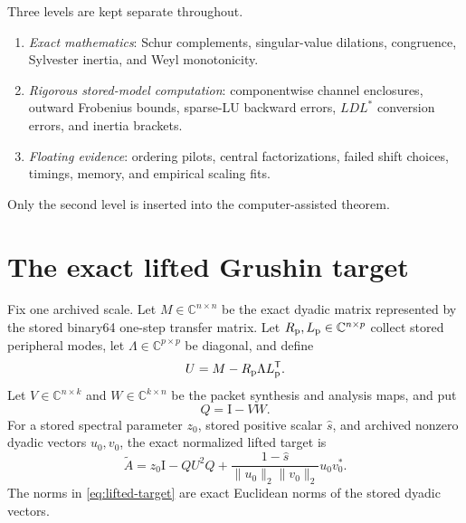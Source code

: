 \documentclass[11pt]{article}
\theoremstyle{definition}
\theoremstyle{remark}
\newcommand{\C}{\mathbb C}
\newcommand{\Id}{\mathrm I}
\newcommand{\Atilde}{\widetilde A}
\begin{document}
Three levels are kept separate throughout.
\begin{enumerate}
 \item \emph{Exact mathematics}: Schur complements, singular-value
       dilations, congruence, Sylvester inertia, and Weyl monotonicity.
 \item \emph{Rigorous stored-model computation}: componentwise channel
       enclosures, outward Frobenius bounds, sparse-LU backward errors,
       $LDL^*$ conversion errors, and inertia brackets.
 \item \emph{Floating evidence}: ordering pilots, central factorizations,
       failed shift choices, timings, memory, and empirical scaling fits.
\end{enumerate}
Only the second level is inserted into the computer-assisted theorem.


\section{The exact lifted Grushin target}
\label{sec:target}

Fix one archived scale.  Let $M\in\C^{n\times n}$ be the exact dyadic matrix
represented by the stored binary64 one-step transfer matrix.  Let
$R_{\rm p},L_{\rm p}\in\C^{n\times p}$ collect stored peripheral modes,
let $\Lambda\in\C^{p\times p}$ be diagonal, and define
\begin{equation}
 U=M-R_{\rm p}\Lambda L_{\rm p}^{\mathsf T}.
 \label{eq:one-step}
\end{equation}
Let $V\in\C^{n\times k}$ and $W\in\C^{k\times n}$ be the packet synthesis
and analysis maps, and put
\begin{equation}
 Q=\Id-VW.
 \label{eq:packet-complement}
\end{equation}
For a stored spectral parameter $z_0$, stored positive scalar
$\widehat s$, and archived nonzero dyadic vectors $u_0,v_0$, the exact
normalized lifted target is
\begin{equation}
 \Atilde
 =z_0\Id-QU^2Q+
 \frac{1-\widehat s}{\|u_0\|_2\|v_0\|_2}u_0v_0^*.
 \label{eq:lifted-target}
\end{equation}
The norms in \cref{eq:lifted-target} are exact Euclidean norms of the stored
dyadic vectors.
\end{document}

